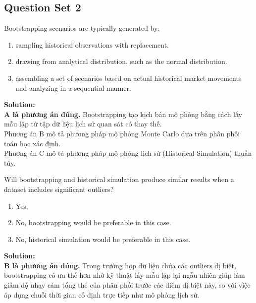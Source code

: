 \subsection{Question Set 2}
\label{subsec:app_mod9_Question_Set_2}

\begin{tcolorbox}[
	colback=gray!5!white,
	colframe=black!15!white,
	boxrule=0.5pt,
	arc=3pt,
	title=\textbf{Question 1},
	coltitle=black,
	colbacktitle=black!5!white,
	before skip=6pt,
	after skip=6pt,
	breakable
]
Bootstrapping scenarios are typically generated by:
\begin{enumerate}[label=\Alph*.]
	\item sampling historical observations with replacement.
	\item drawing from analytical distribution, such as the normal distribution.
	\item assembling a set of scenarios based on actual historical market movements and analyzing in a sequential manner.
\end{enumerate}

\textbf{Solution:} \\
\textbf{A là phương án đúng.} Bootstrapping tạo kịch bản mô phỏng bằng cách lấy mẫu lặp từ tập dữ liệu lịch sử quan sát có thay thế. \\
Phương án B mô tả phương pháp mô phỏng Monte Carlo dựa trên phân phối toán học xác định. \\
Phương án C mô tả phương pháp mô phỏng lịch sử (Historical Simulation) thuần túy.
\end{tcolorbox}

\begin{tcolorbox}[
	colback=gray!5!white,
	colframe=black!15!white,
	boxrule=0.5pt,
	arc=3pt,
	title=\textbf{Question 2},
	coltitle=black,
	colbacktitle=black!5!white,
	before skip=6pt,
	after skip=6pt,
	breakable
]
Will bootstrapping and historical simulation produce similar results when a dataset includes significant outliers?
\begin{enumerate}[label=\Alph*.]
	\item Yes.
	\item No, bootstrapping would be preferable in this case.
	\item No, historical simulation would be preferable in this case.
\end{enumerate}

\textbf{Solution:} \\
\textbf{B là phương án đúng.} Trong trường hợp dữ liệu chứa các outliers dị biệt, bootstrapping có ưu thế hơn nhờ kỹ thuật lấy mẫu lặp lại ngẫu nhiên giúp làm giảm độ nhạy cảm tổng thể của phân phối trước các điểm dị biệt này, so với việc áp dụng chuỗi thời gian cố định trực tiếp như mô phỏng lịch sử.
\end{tcolorbox}

